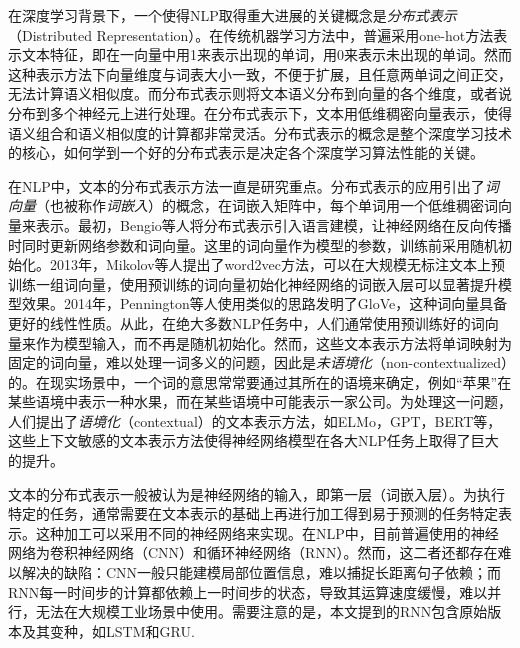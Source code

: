在深度学习背景下，一个使得NLP取得重大进展的关键概念是\emph{分布式表示}（Distributed Representation）\cite{Hinton:1986:DR:104279.104287}。在传统机器学习方法中，普遍采用one-hot方法表示文本特征，即在一向量中用1来表示出现的单词，用0来表示未出现的单词。然而这种表示方法下向量维度与词表大小一致，不便于扩展，且任意两单词之间正交，无法计算语义相似度。而分布式表示则将文本语义分布到向量的各个维度，或者说分布到多个神经元上进行处理。在分布式表示下，文本用低维稠密向量表示，使得语义组合和语义相似度的计算都非常灵活。分布式表示的概念是整个深度学习技术的核心，如何学到一个好的分布式表示是决定各个深度学习算法性能的关键。

在NLP中，文本的分布式表示方法一直是研究重点。分布式表示的应用引出了\emph{词向量}（也被称作\emph{词嵌入}）的概念，在词嵌入矩阵中，每个单词用一个低维稠密词向量来表示。最初，Bengio等人\cite{DBLP:conf/nips/BengioDV00}将分布式表示引入语言建模，让神经网络在反向传播时同时更新网络参数和词向量。这里的词向量作为模型的参数，训练前采用随机初始化。2013年，Mikolov等人\cite{DBLP:conf/nips/MikolovSCCD13}提出了word2vec方法，可以在大规模无标注文本上预训练一组词向量，使用预训练的词向量初始化神经网络的词嵌入层可以显著提升模型效果。2014年，Pennington等人\cite{DBLP:conf/emnlp/PenningtonSM14}使用类似的思路发明了GloVe，这种词向量具备更好的线性性质。从此，在绝大多数NLP任务中，人们通常使用预训练好的词向量来作为模型输入，而不再是随机初始化。然而，这些文本表示方法将单词映射为固定的词向量，难以处理一词多义的问题，因此是\emph{未语境化}（non-contextualized）的。在现实场景中，一个词的意思常常要通过其所在的语境来确定，例如“苹果”在某些语境中表示一种水果，而在某些语境中可能表示一家公司。为处理这一问题，人们提出了\emph{语境化}（contextual）的文本表示方法，如ELMo\cite{DBLP:conf/naacl/PetersNIGCLZ18}，GPT\cite{radford2018improving}，BERT\cite{devlin2018bert}等，这些上下文敏感的文本表示方法使得神经网络模型在各大NLP任务上取得了巨大的提升。

文本的分布式表示一般被认为是神经网络的输入，即第一层（词嵌入层）。为执行特定的任务，通常需要在文本表示的基础上再进行加工得到易于预测的任务特定表示。这种加工可以采用不同的神经网络来实现。在NLP中，目前普遍使用的神经网络为卷积神经网络（CNN）\cite{DBLP:conf/icml/CollobertW08}\cite{DBLP:conf/emnlp/Kim14}\cite{DBLP:conf/icml/GehringAGYD17}和循环神经网络（RNN）\cite{DBLP:conf/interspeech/MikolovKBCK10}\cite{DBLP:conf/emnlp/WenGMSVY15}\cite{DBLP:conf/acl/MaH16}。然而，这二者还都存在难以解决的缺陷：CNN一般只能建模局部位置信息，难以捕捉长距离句子依赖；而RNN每一时间步的计算都依赖上一时间步的状态，导致其运算速度缓慢，难以并行，无法在大规模工业场景中使用。需要注意的是，本文提到的RNN包含原始版本及其变种，如LSTM\cite{DBLP:journals/neco/GersSC00}和GRU\cite{DBLP:journals/corr/ChungGCB14}.


